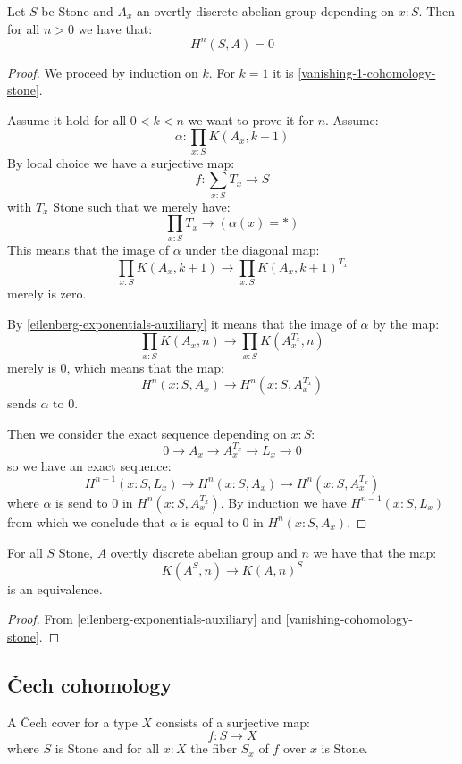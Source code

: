 \begin{theorem}\label{vanishing-cohomology-stone}
Let $S$ be Stone and $A_x$ an overtly discrete abelian group depending on $x:S$. Then for all $n>0$ we have that:
\[H^n(S,A) = 0\]
\end{theorem}

\begin{proof}
We proceed by induction on $k$. For $k=1$ it is \cref{vanishing-1-cohomology-stone}.

Assume it hold for all $0<k<n$ we want to prove it for $n$. Assume:
\[\alpha : \prod_{x:S} K(A_x,k+1)\]
By local choice we have a surjective map:
\[f:\sum_{x:S}T_x\to S\]
with $T_x$ Stone such that we merely have:
\[\prod_{x:S} T_x\to (\alpha(x) = *)\]
This means that the image of $\alpha$ under the diagonal map:
\[\prod_{x:S} K(A_x,k+1) \to \prod_{x:S} K(A_x,k+1)^{T_x}\]
merely is zero.

By \cref{eilenberg-exponentials-auxiliary} it means that the image of $\alpha$ by the map:
\[\prod_{x:S} K(A_x,n) \to \prod_{x:S} K(A_x^{T_x},n)\]
merely is $0$, which means that the map:
\[H^{n}(x:S,A_x) \to H^{n}(x:S,A_x^{T_x})\]
sends $\alpha$ to $0$. 

Then we consider the exact sequence depending on $x:S$:
\[0\to A_x\to A_x^{T_x}\to L_x\to 0\]
so we have an exact sequence: 
\[H^{n-1}(x:S,L_x)\to H^n(x:S,A_x)\to H^n(x:S,A_x^{T_x})\]
where $\alpha$ is send to $0$ in $H^n(x:S,A_x^{T_x})$. By induction we have $H^{n-1}(x:S,L_x)$ from which we conclude that $\alpha$ is equal to $0$ in $H^n(x:S,A_x)$.
\end{proof}

\begin{corollary}\label{eilenberg-exponentials}
For all $S$ Stone, $A$ overtly discrete abelian group  and $n$ we have that the map:
\[K(A^S,n) \to K(A,n)^S\]
is an equivalence.
\end{corollary}

\begin{proof}
From \cref{eilenberg-exponentials-auxiliary} and \cref{vanishing-cohomology-stone}.
\end{proof}


\subsection{\v{C}ech cohomology}

\begin{definition}
A \v{C}ech cover for a type $X$ consists of a surjective map:
\[f:S\to X\]
where $S$ is Stone and for all $x:X$ the fiber $S_x$ of $f$ over $x$ is Stone.
\end{definition}

